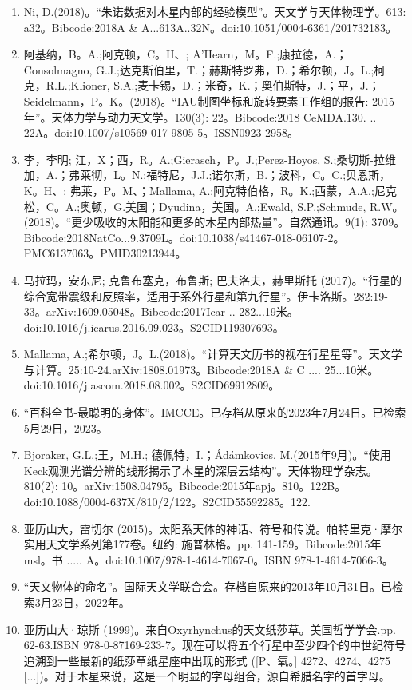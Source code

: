 \begin{enumerate}
\item Ni, D.(2018)。“朱诺数据对木星内部的经验模型”。天文学与天体物理学。613: a32。Bibcode:2018A & A...613A..32N。doi:10.1051/0004-6361/201732183。
\item 阿基纳，B。A.;阿克顿，C。H、; A'Hearn，M。F.;康拉德，A.；Consolmagno, G.J.;达克斯伯里，T.；赫斯特罗弗，D.；希尔顿，J。L.;柯克，R.L.;Klioner, S.A.;麦卡锡，D.；米奇，K.；奥伯斯特，J.；平，J.；Seidelmann，P。K。(2018)。“IAU制图坐标和旋转要素工作组的报告: 2015年”。天体力学与动力天文学。130(3): 22。Bibcode:2018 CeMDA.130. .. 22A。doi:10.1007/s10569-017-9805-5。ISSN0923-2958。 
\item 李，李明; 江，X；西，R。A.;Gierasch，P。J.;Perez-Hoyos, S.;桑切斯-拉维加，A.；弗莱彻，L。N.;福特尼，J.J.;诺尔斯，B.；波科，C。C.;贝恩斯，K。H、; 弗莱，P。M、；Mallama, A.;阿克特伯格，R。K.;西蒙，A.A.;尼克松，C。A.;奥顿，G.美国；Dyudina，美国。A.;Ewald, S.P.;Schmude, R.W。(2018)。“更少吸收的太阳能和更多的木星内部热量”。自然通讯。9(1): 3709。Bibcode:2018NatCo...9.3709L。doi:10.1038/s41467-018-06107-2。PMC6137063。PMID30213944。  
\item 马拉玛，安东尼; 克鲁布塞克，布鲁斯; 巴夫洛夫，赫里斯托 (2017)。“行星的综合宽带震级和反照率，适用于系外行星和第九行星”。伊卡洛斯。282:19-33。arXiv:1609.05048。Bibcode:2017Icar .. 282...19米。doi:10.1016/j.icarus.2016.09.023。S2CID119307693。 
\item Mallama, A.;希尔顿，J。L.(2018)。“计算天文历书的视在行星星等”。天文学与计算。25:10-24.arXiv:1808.01973。Bibcode:2018A & C .... 25...10米。doi:10.1016/j.ascom.2018.08.002。S2CID69912809。 
\item “百科全书-最聪明的身体”。IMCCE。已存档从原来的2023年7月24日。已检索5月29日，2023。
\item Bjoraker, G.L.;王，M.H.; 德佩特，I.；Ádámkovics, M.(2015年9月)。“使用Keck观测光谱分辨的线形揭示了木星的深层云结构”。天体物理学杂志。810(2): 10。arXiv:1508.04795。Bibcode:2015年apj。810。122B。doi:10.1088/0004-637X/810/2/122。S2CID55592285。122. 
\item 亚历山大，雷切尔 (2015)。太阳系天体的神话、符号和传说。帕特里克·摩尔实用天文学系列第177卷。纽约: 施普林格。pp. 141-159。Bibcode:2015年msl。书 ..... A。doi:10.1007/978-1-4614-7067-0。ISBN 978-1-4614-7066-3。
\item “天文物体的命名”。国际天文学联合会。存档自原来的2013年10月31日。已检索3月23日，2022年。
\item 亚历山大·琼斯 (1999)。来自Oxyrhynchus的天文纸莎草。美国哲学学会.pp. 62-63.ISBN 978-0-87169-233-7。现在可以将五个行星中至少四个的中世纪符号追溯到一些最新的纸莎草纸星座中出现的形式 ([P、氧。] 4272、4274、4275 [...])。对于木星来说，这是一个明显的字母组合，源自希腊名字的首字母。

\end{enumerate}
